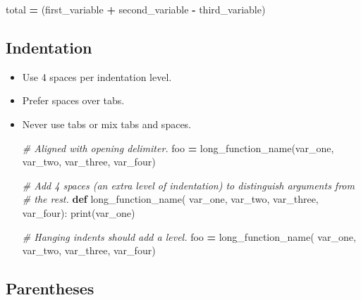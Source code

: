 \documentclass[
]{book}
\newenvironment{Shaded}{\begin{snugshade}}{\end{snugshade}}
\newcommand{\BuiltInTok}[1]{#1}
\newcommand{\CommentTok}[1]{\textcolor[rgb]{0.56,0.35,0.01}{\textit{#1}}}
\newcommand{\KeywordTok}[1]{\textcolor[rgb]{0.13,0.29,0.53}{\textbf{#1}}}
\newcommand{\NormalTok}[1]{#1}
\newcommand{\OperatorTok}[1]{\textcolor[rgb]{0.81,0.36,0.00}{\textbf{#1}}}
\begin{document}
\begin{itemize}
\begin{Shaded}
\begin{Highlighting}[]
\NormalTok{total }\OperatorTok{=}\NormalTok{ (first_variable}
         \OperatorTok{+}\NormalTok{ second_variable}
         \OperatorTok{-}\NormalTok{ third_variable)}
\end{Highlighting}
\end{Shaded}
\end{itemize}

\hypertarget{indentation}{%
\subsection{Indentation}\label{indentation}}

\begin{itemize}
\item
  Use 4 spaces per indentation level.
\item
  Prefer spaces over tabs.
\item
  Never use tabs or mix tabs and spaces.

\begin{Shaded}
\begin{Highlighting}[]
\CommentTok{# Aligned with opening delimiter.}
\NormalTok{foo }\OperatorTok{=}\NormalTok{ long_function_name(var_one, var_two,}
\NormalTok{                         var_three, var_four)}

\CommentTok{# Add 4 spaces (an extra level of indentation) to distinguish arguments from }
\CommentTok{# the rest.}
\KeywordTok{def}\NormalTok{ long_function_name(}
\NormalTok{        var_one, var_two, var_three,}
\NormalTok{        var_four):}
    \BuiltInTok{print}\NormalTok{(var_one)}

\CommentTok{# Hanging indents should add a level.}
\NormalTok{foo }\OperatorTok{=}\NormalTok{ long_function_name(}
\NormalTok{    var_one, var_two,}
\NormalTok{    var_three, var_four)}
\end{Highlighting}
\end{Shaded}
\end{itemize}

\hypertarget{parentheses}{%
\subsection{Parentheses}\label{parentheses}}
\end{document}
